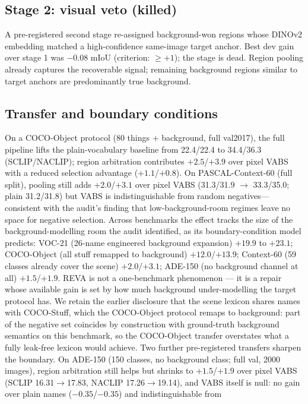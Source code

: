 \documentclass[11pt]{article}
\newcommand{\miou}{mIoU}
\newcommand{\reva}{REVA}
\begin{document}
\subsection{Stage 2: visual veto (killed)}
A pre-registered second stage re-assigned background-won regions whose DINOv2 \citep{oquab2024dinov2}
embedding matched a high-confidence same-image target anchor. Best dev gain over stage
1 was $-0.08$ \miou{} (criterion: $\ge +1$); the stage is dead. Region pooling already
captures the recoverable signal; remaining background regions similar to target
anchors are predominantly true background.

\subsection{Transfer and boundary conditions}
\label{sec:transfer}
On a COCO-Object protocol (80 things + background, full val2017), the full pipeline
lifts the plain-vocabulary baseline from 22.4/22.4 to 34.4/36.3 (SCLIP/NACLIP); region
arbitration contributes $+2.5$/$+3.9$ over pixel VABS with a reduced selection
advantage ($+1.1$/$+0.8$). On PASCAL-Context-60 (full split), pooling still adds $+2.0$/$+3.1$
over pixel VABS (31.3/31.9 $\rightarrow$ 33.3/35.0; plain 31.2/31.8)
but VABS is indistinguishable from random
negatives---consistent with the audit's
finding that low-background-room regimes leave no space for negative selection.
Across benchmarks the effect tracks the size of the background-modelling room
the audit identified, as its boundary-condition model predicts: VOC-21 (26-name
engineered background expansion) $+19.9$ to $+23.1$; COCO-Object (all stuff
remapped to background) $+12.0$/$+13.9$; Context-60 (59 classes already cover
the scene) $+2.0$/$+3.1$; ADE-150 (no background channel at all) $+1.5$/$+1.9$.
\reva{} is not a one-benchmark phenomenon --- it is a repair whose available
gain is set by how much background under-modelling the target protocol has. We
retain the earlier disclosure that the scene lexicon shares names with COCO-Stuff,
which the COCO-Object protocol remaps to background: part of the negative set
coincides by construction with ground-truth background semantics on this benchmark,
so the COCO-Object transfer overstates what a fully leak-free lexicon would achieve.
Two further pre-registered transfers sharpen the boundary. On ADE-150 (150 classes,
no background class; full val, 2000 images), region arbitration still helps but shrinks to
$+1.5$/$+1.9$ over pixel VABS (SCLIP 16.31$\to$17.83, NACLIP 17.26$\to$19.14), and VABS
itself is null: no gain over plain names ($-0.35$/$-0.35$) and indistinguishable from
\end{document}
